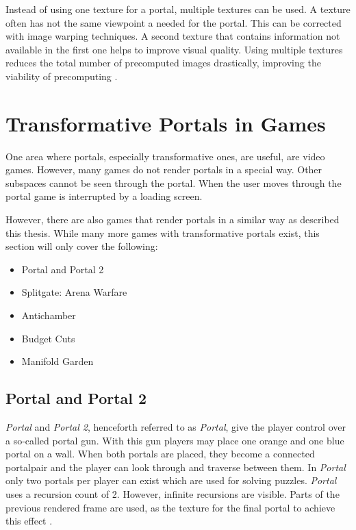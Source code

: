 Instead of using one texture for a portal, multiple textures can be used. A texture often has not the same viewpoint a needed for the portal. This can be corrected with image warping techniques. A second texture that contains information not available in the first one helps to improve visual quality. Using multiple textures reduces the total number of precomputed images drastically, improving the viability of precomputing \cite{rafferty:1998:3d}.

\section{Transformative Portals in Games}
One area where portals, especially transformative ones, are useful, are video games. However, many games do not render portals in a special way. Other subspaces cannot be seen through the portal. When the user moves through the portal game is interrupted by a loading screen. 

However, there are also games that render portals in a similar way as described this thesis. While many more games with transformative portals exist, this section will only cover the following:
\begin{itemize}
	\item Portal and Portal 2
	\item Splitgate: Arena Warfare
	\item Antichamber
	\item Budget Cuts
	\item Manifold Garden
	
	
\end{itemize}

\subsection{Portal and Portal 2}
\textit{Portal} and \textit{Portal 2}, henceforth referred to as \textit{Portal}, give the player control over a so-called portal gun. With this gun players may place one orange and one blue portal on a wall. When both portals are placed, they become a connected \gls{portalpair} and the player can look through and traverse between them. In \textit{Portal} only two portals per player can exist which are used for solving puzzles. \textit{Portal} uses a recursion count of 2. However, infinite recursions are visible. Parts of the previous rendered frame are used, as the texture for the final portal to achieve this effect \cite{lecture:portalProblems}.

